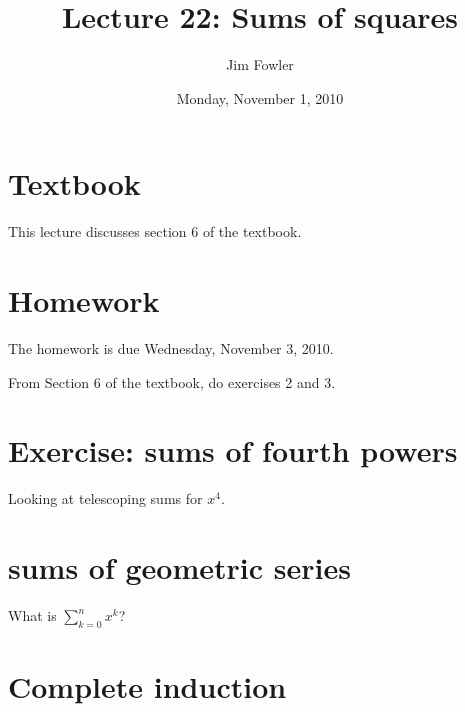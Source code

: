 \documentclass[12pt]{handout}
\title{Lecture 22: Sums of squares}
\author{Jim Fowler}
\date{Monday, November  1, 2010}
\begin{document}
\maketitle

\section*{Textbook}

This lecture discusses section 6 of the textbook.

\section*{Homework} 

The homework is due Wednesday, November  3, 2010.

From Section 6 of the textbook, do exercises 2 and 3.

\section*{Exercise: sums of fourth powers}

Looking at telescoping sums for $x^4$.

\section*{sums of geometric series}

What is $\sum_{k=0}^n x^k$?

\section*{Complete induction}
\end{document}
